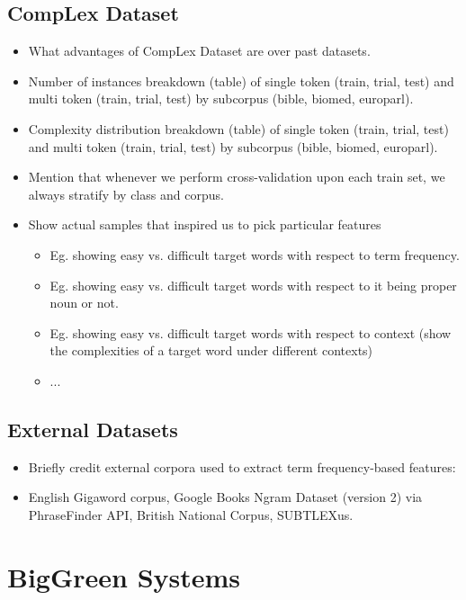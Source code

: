 \documentclass[11pt,a4paper]{article}
\begin{document}
\subsection{CompLex Dataset}

\begin{itemize}
  \item What advantages of CompLex Dataset are over past datasets.
  \item Number of instances breakdown (table) of single token (train, trial, test) and multi token (train, trial, test) by subcorpus (bible, biomed, europarl).
  \item Complexity distribution breakdown (table) of single token (train, trial, test) and multi token (train, trial, test) by subcorpus (bible, biomed, europarl).
  \item Mention that whenever we perform cross-validation upon each train set, we always stratify by class and corpus.
  \item Show actual samples that inspired us to pick particular features 
  \begin{itemize}
    \item Eg. showing easy vs. difficult target words with respect to term frequency.
    \item Eg. showing easy vs. difficult target words with respect to it being proper noun or not.
    \item Eg. showing easy vs. difficult target words with respect to context (show the complexities of a target word under different contexts)
    \item ...
  \end{itemize}
\end{itemize}

\subsection{External Datasets}

\begin{itemize}
  \item Briefly credit external corpora used to extract term frequency-based features:
  \item English Gigaword corpus, Google Books Ngram Dataset (version 2) via PhraseFinder API, British National Corpus, SUBTLEXus.
\end{itemize}

\section{BigGreen Systems}
\end{document}
